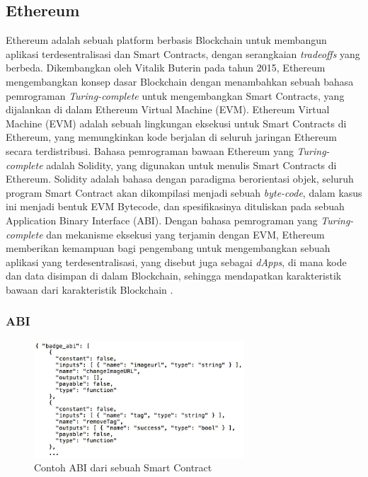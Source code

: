 \subsection{Ethereum}
\label{subsec:ethereum}

Ethereum adalah sebuah platform berbasis Blockchain untuk membangun aplikasi terdesentralisasi dan Smart Contracts, dengan serangkaian \textit{tradeoffs} yang berbeda. Dikembangkan oleh Vitalik Buterin pada tahun 2015, Ethereum mengembangkan konsep dasar Blockchain dengan menambahkan sebuah bahasa pemrograman \textit{Turing-complete} untuk mengembangkan Smart Contracts, yang dijalankan di dalam Ethereum Virtual Machine (EVM). Ethereum Virtual Machine (EVM) adalah sebuah lingkungan eksekusi untuk Smart Contracts di Ethereum, yang memungkinkan kode berjalan di seluruh jaringan Ethereum secara terdistribusi. Bahasa pemrograman bawaan Ethereum yang \textit{Turing-complete} adalah Solidity, yang digunakan untuk menulis Smart Contracts di Ethereum. Solidity adalah bahasa dengan paradigma berorientasi objek, seluruh program Smart Contract akan dikompilasi menjadi sebuah \textit{byte-code}, dalam kasus ini menjadi bentuk EVM Bytecode, dan spesifikasinya dituliskan pada sebuah Application Binary Interface (ABI). Dengan bahasa pemrograman yang \textit{Turing-complete} dan mekanisme eksekusi yang terjamin dengan EVM, Ethereum memberikan kemampuan bagi pengembang untuk mengembangkan sebuah aplikasi yang terdesentralisasi, yang disebut juga sebagai \textit{dApps}, di mana kode dan data disimpan di dalam Blockchain, sehingga mendapatkan karakteristik bawaan dari karakteristik Blockchain \parencite{buterin2013ethereum}.

\subsubsection{ABI}
\label{subsubsec:abi}

\begin{figure}[ht]
  \centering
  \includegraphics[width=0.7\textwidth]{resources/chapter-2/smart-contract-abi.jpg}
  \caption{Contoh ABI dari sebuah Smart Contract \parencite{third2017linked}}
  \label{image:abi-example}
\end{figure}

